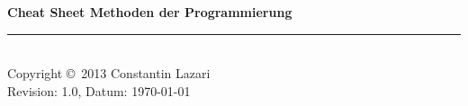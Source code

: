 \documentclass[10pt,landscape]{scrartcl}
\begin{document}
	\raggedright
	\footnotesize
	\begin{multicols}{3}


	\setlength{\premulticols}{1pt}
	\setlength{\postmulticols}{1pt}
	\setlength{\multicolsep}{1pt}
	\setlength{\columnsep}{2pt}
	\newlength{\MyLenA}
	\newlength{\MyLenB}

	\begin{center}
	\large{\textbf{Cheat Sheet Methoden der Programmierung}} \\
	\end{center}


	


	\rule{0.3\linewidth}{0.25pt}\\
	\scriptsize
	Copyright \copyright\ 2013 Constantin Lazari\\
	Revision: 1.0, Datum: \today\\
	\end{multicols}
\end{document}
